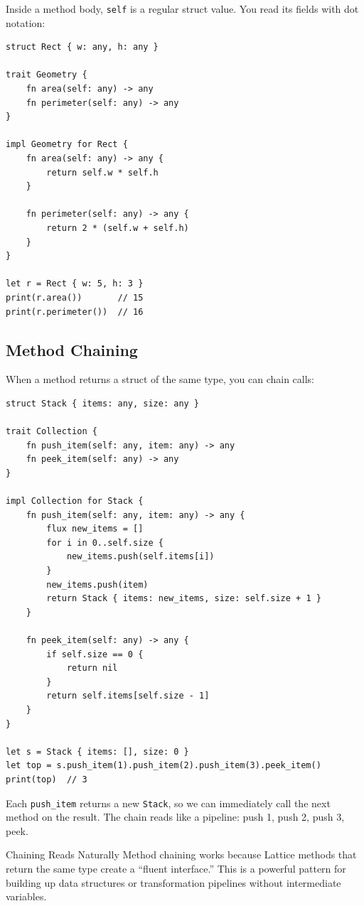 Inside a method body, \lstinline|self| is a regular struct value. You read
its fields with dot notation:

\begin{lstlisting}[language=Lattice, caption={Reading fields from self}]
struct Rect { w: any, h: any }

trait Geometry {
    fn area(self: any) -> any
    fn perimeter(self: any) -> any
}

impl Geometry for Rect {
    fn area(self: any) -> any {
        return self.w * self.h
    }

    fn perimeter(self: any) -> any {
        return 2 * (self.w + self.h)
    }
}

let r = Rect { w: 5, h: 3 }
print(r.area())       // 15
print(r.perimeter())  // 16
\end{lstlisting}

\subsection{Method Chaining}

When a method returns a struct of the same type, you can chain calls:

\begin{lstlisting}[language=Lattice, caption={Method chaining}]
struct Stack { items: any, size: any }

trait Collection {
    fn push_item(self: any, item: any) -> any
    fn peek_item(self: any) -> any
}

impl Collection for Stack {
    fn push_item(self: any, item: any) -> any {
        flux new_items = []
        for i in 0..self.size {
            new_items.push(self.items[i])
        }
        new_items.push(item)
        return Stack { items: new_items, size: self.size + 1 }
    }

    fn peek_item(self: any) -> any {
        if self.size == 0 {
            return nil
        }
        return self.items[self.size - 1]
    }
}

let s = Stack { items: [], size: 0 }
let top = s.push_item(1).push_item(2).push_item(3).peek_item()
print(top)  // 3
\end{lstlisting}

Each \lstinline|push_item| returns a new \lstinline|Stack|, so we can
immediately call the next method on the result. The chain reads like a
pipeline: push 1, push 2, push 3, peek.

\begin{tipbox}{Chaining Reads Naturally}
Method chaining works because Lattice methods that return the same type
create a ``fluent interface.'' This is a powerful pattern for building up
data structures or transformation pipelines without intermediate variables.
\end{tipbox}

